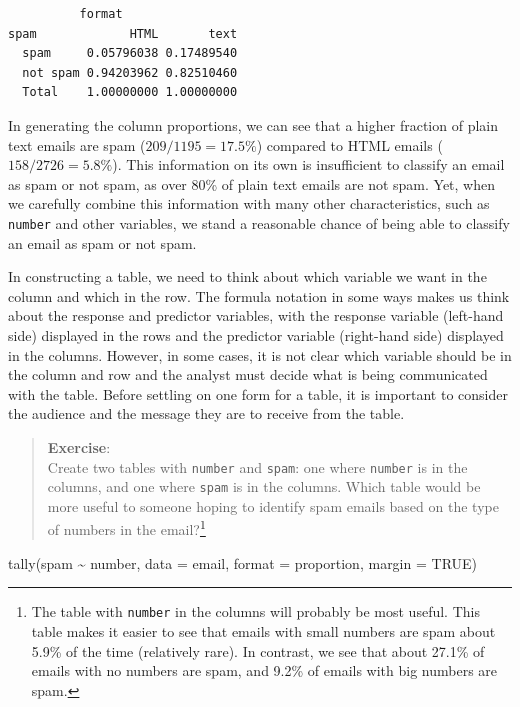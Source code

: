 \documentclass[
  letterpaper,
  DIV=11,
  numbers=noendperiod]{scrreprt}
\newenvironment{Shaded}{\begin{snugshade}}{\end{snugshade}}
\newcommand{\AttributeTok}[1]{\textcolor[rgb]{0.40,0.45,0.13}{#1}}
\newcommand{\ConstantTok}[1]{\textcolor[rgb]{0.56,0.35,0.01}{#1}}
\newcommand{\FunctionTok}[1]{\textcolor[rgb]{0.28,0.35,0.67}{#1}}
\newcommand{\NormalTok}[1]{\textcolor[rgb]{0.00,0.23,0.31}{#1}}
\newcommand{\SpecialCharTok}[1]{\textcolor[rgb]{0.37,0.37,0.37}{#1}}
\newcommand{\StringTok}[1]{\textcolor[rgb]{0.13,0.47,0.30}{#1}}
\begin{document}
\begin{verbatim}
          format
spam             HTML       text
  spam     0.05796038 0.17489540
  not spam 0.94203962 0.82510460
  Total    1.00000000 1.00000000
\end{verbatim}

In generating the column proportions, we can see that a higher fraction
of plain text emails are spam (\(209 / 1195 = 17.5\%\)) compared to HTML
emails (\(158 / 2726 = 5.8\%\)). This information on its own is
insufficient to classify an email as spam or not spam, as over 80\% of
plain text emails are not spam. Yet, when we carefully combine this
information with many other characteristics, such as \texttt{number} and
other variables, we stand a reasonable chance of being able to classify
an email as spam or not spam.

In constructing a table, we need to think about which variable we want
in the column and which in the row. The formula notation in some ways
makes us think about the response and predictor variables, with the
response variable (left-hand side) displayed in the rows and the
predictor variable (right-hand side) displayed in the columns. However,
in some cases, it is not clear which variable should be in the column
and row and the analyst must decide what is being communicated with the
table. Before settling on one form for a table, it is important to
consider the audience and the message they are to receive from the
table.

\begin{quote}
\textbf{Exercise}:\\
Create two tables with \texttt{number} and \texttt{spam}: one where
\texttt{number} is in the columns, and one where \texttt{spam} is in the
columns. Which table would be more useful to someone hoping to identify
spam emails based on the type of numbers in the email?\footnote{The
  table with \texttt{number} in the columns will probably be most
  useful. This table makes it easier to see that emails with small
  numbers are spam about 5.9\% of the time (relatively rare). In
  contrast, we see that about 27.1\% of emails with no numbers are spam,
  and 9.2\% of emails with big numbers are spam.}
\end{quote}

\begin{Shaded}
\begin{Highlighting}[]
\FunctionTok{tally}\NormalTok{(spam }\SpecialCharTok{\textasciitilde{}}\NormalTok{ number, }\AttributeTok{data =}\NormalTok{ email, }\AttributeTok{format =} \StringTok{\textquotesingle{}proportion\textquotesingle{}}\NormalTok{, }\AttributeTok{margin =} \ConstantTok{TRUE}\NormalTok{)}
\end{Highlighting}
\end{Shaded}
\end{document}
